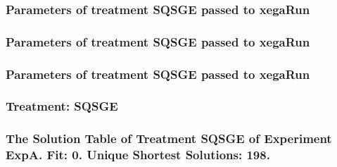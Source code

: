 \documentclass[18pt,c]{beamer}
\begin{document}

 \begin{frame}
 \fontsize{8pt}{9pt}\selectfont
 \frametitle{  Parameters of treatment SQSGE passed to xegaRun
 }

 \label{ExpAtParmTable013.tex}  
 \end{frame}


 \begin{frame}
 \fontsize{8pt}{9pt}\selectfont
 \frametitle{  Parameters of treatment SQSGE passed to xegaRun
 }

 \label{ExpAtParmTable014.tex}  
 \end{frame}


 \begin{frame}
 \fontsize{8pt}{9pt}\selectfont
 \frametitle{  Parameters of treatment SQSGE passed to xegaRun
 }

 \label{ExpAtParmTable015.tex}  
 \end{frame}

 \begin{frame}
 \fontsize{8pt}{9pt}\selectfont
 \frametitle{ Treatment: SQSGE }

 \label{ExpAStatsTable018.tex}  
 \end{frame}

 \begin{frame}
 \fontsize{8pt}{9pt}\selectfont
 \frametitle{ The Solution Table of Treatment SQSGE of Experiment ExpA. Fit: 0. Unique Shortest Solutions: 198. }

 \label{ExpASolutionTable003.tex}  
 \end{frame}
\end{document}
